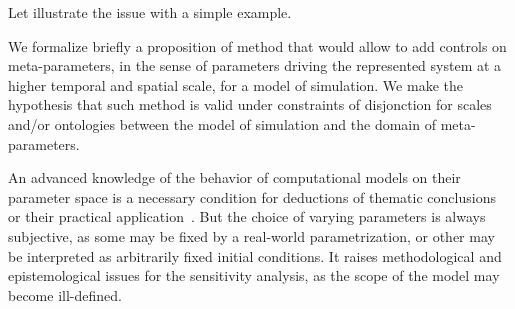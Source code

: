 Let illustrate the issue with a simple example.

We formalize briefly a proposition of method that would allow to add controls on meta-parameters, in the sense of parameters driving the represented system at a higher temporal and spatial scale, for a model of simulation. We make the hypothesis that such method is valid under constraints of disjonction for scales and/or ontologies between the model of simulation and the domain of meta-parameters.




An advanced knowledge of the behavior of computational models on their parameter space is a necessary condition for deductions of thematic conclusions or their practical application~\cite{banos2013pour}. But the choice of varying parameters is always subjective, as some may be fixed by a real-world parametrization, or other may be interpreted as arbitrarily fixed initial conditions. It raises methodological and epistemological issues for the sensitivity analysis, as the scope of the model may become ill-defined.

